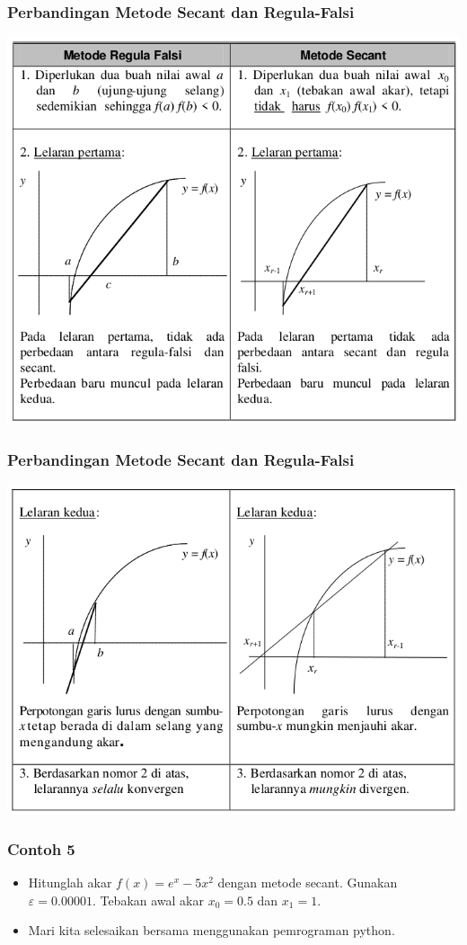 \documentclass[pdflatex,compress]{beamer}
\begin{document}
\begin{frame}
	\frametitle{Perbandingan Metode Secant dan Regula-Falsi}
	\begin{center}
		\includegraphics[width=0.7\linewidth]{img/img17}
	\end{center}
\end{frame}

\begin{frame}
	\frametitle{Perbandingan Metode Secant dan Regula-Falsi}
	\begin{center}
		\includegraphics[width=0.7\linewidth]{img/img18}
	\end{center}
\end{frame}

\begin{frame}
	\frametitle{Contoh 5}
	\begin{itemize}
		\item Hitunglah akar $ f(x) = e^x - 5x^2 $ dengan metode secant. Gunakan $\varepsilon = 0.00001$. Tebakan awal akar $ x_0 = 0.5 $ dan $ x_1 = 1 $.
		\item Mari kita selesaikan bersama menggunakan pemrograman python.
	\end{itemize}
\end{frame}
\end{document}
